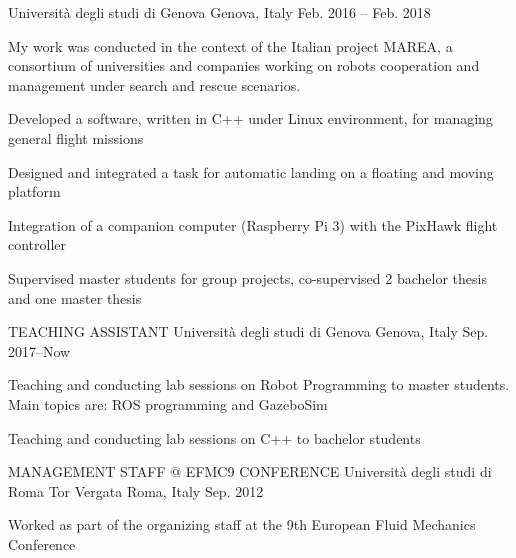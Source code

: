 \begin{cventries}
    {Università degli studi di Genova} %
    {Genova, Italy} %
    {Feb. 2016 – Feb. 2018} %
    {
      \begin{cvparagraph}
      My work was conducted in the context of the Italian project MAREA, a consortium of universities and companies working on robots cooperation and management under search and rescue scenarios.
      \end{cvparagraph}
      \begin{cvitems} %
        \item {Developed a software, written in C++ under Linux environment, for managing general flight missions}
        \item {Designed and integrated a task for  automatic landing on a floating and moving platform}
        \item {Integration of a companion computer (Raspberry Pi 3) with the PixHawk flight controller}
        \item {Supervised master students for group projects, co-supervised 2 bachelor thesis and one master thesis}
     \end{cvitems}
    }
    \vspace{10pt}  
  \cventry
    {TEACHING ASSISTANT} %
    {Università degli studi di Genova} %
    {Genova, Italy} %
    {Sep. 2017–Now} %
    {
      \begin{cvitems} %
        \item {Teaching and conducting lab sessions on Robot Programming to master students. Main topics are: ROS programming and GazeboSim}
        \item {Teaching and conducting lab sessions on C++ to bachelor students}
      \end{cvitems}
    }


  \cventry
    {MANAGEMENT STAFF @ EFMC9 CONFERENCE} %
    {Università degli studi di Roma Tor Vergata} %
    {Roma, Italy} %
    {Sep. 2012} %
    {
      \begin{cvitems} %
        \item {Worked as part of the organizing staff at the 9th European Fluid Mechanics Conference}
      \end{cvitems}
    }

\end{cventries}
